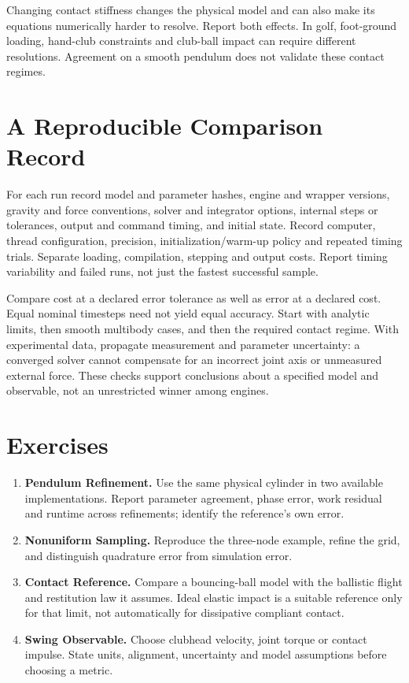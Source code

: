 Changing contact stiffness changes the physical model and can also make its
equations numerically harder to resolve. Report both effects. In golf,
foot-ground loading, hand-club constraints and club-ball impact can require
different resolutions. Agreement on a smooth pendulum does not validate these
contact regimes.

\section{A Reproducible Comparison Record}

For each run record model and parameter hashes, engine and wrapper versions,
gravity and force conventions, solver and integrator options, internal steps or
tolerances, output and command timing, and initial state. Record computer,
thread configuration, precision, initialization/warm-up policy and repeated
timing trials. Separate loading, compilation, stepping and output costs. Report
timing variability and failed runs, not just the fastest successful sample.

Compare cost at a declared error tolerance as well as error at a declared cost.
Equal nominal timesteps need not yield equal accuracy. Start with analytic
limits, then smooth multibody cases, and then the required contact regime.
With experimental data, propagate measurement and parameter uncertainty: a
converged solver cannot compensate for an incorrect joint axis or unmeasured
external force. These checks support conclusions about a specified model and
observable, not an unrestricted winner among engines.

\section*{Exercises}
\begin{enumerate}
 \item \textbf{Pendulum Refinement.} Use the same physical cylinder in two
 available implementations. Report parameter agreement, phase error, work
 residual and runtime across refinements; identify the reference's own error.
 \item \textbf{Nonuniform Sampling.} Reproduce the three-node example, refine
 the grid, and distinguish quadrature error from simulation error.
 \item \textbf{Contact Reference.} Compare a bouncing-ball model with the
 ballistic flight and restitution law it assumes. Ideal elastic impact is a
 suitable reference only for that limit, not automatically for dissipative
 compliant contact.
 \item \textbf{Swing Observable.} Choose clubhead velocity, joint torque or
 contact impulse. State units, alignment, uncertainty and model assumptions
 before choosing a metric.
\end{enumerate}
